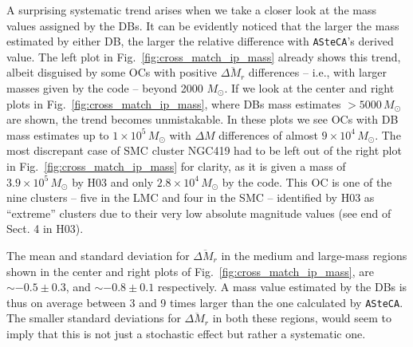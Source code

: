 \documentclass{aa}
\begin{document}
A surprising systematic trend arises when we take a closer look at the mass
values assigned by the DBs. It can be evidently noticed that the larger the
mass estimated by either DB, the larger the relative difference with 
\texttt{ASteCA}'s derived value. The left plot in
Fig.~\ref{fig:cross_match_ip_mass} already shows this trend, albeit disguised by
some OCs with positive $\overline{\Delta M_r}$ differences --
i.e., with larger masses given by the code -- beyond 2000 $M_{\odot}$.
%
If we look at the center and right plots in Fig.~\ref{fig:cross_match_ip_mass},
where DBs mass estimates ${>}5000\,M_{\odot}$ are shown, the trend becomes
unmistakable.
In these plots we see OCs with DB mass estimates up to $1{\times}10^5\,M_{\odot}$
with $\Delta M$ differences of almost $9{\times}10^4\,M_{\odot}$.
The most discrepant case of SMC cluster NGC419 had to be left out of the right
plot in Fig.~\ref{fig:cross_match_ip_mass} for clarity, as it is given a mass of
$3.9{\times}10^5\,M_{\odot}$ by H03 and only $2.8{\times}10^4\,M_{\odot}$ by the
code. This OC is one of the nine clusters -- five in the LMC and four in the SMC
-- identified by H03 as ``extreme'' clusters due to their very low absolute
magnitude values (see end of Sect. 4 in H03).

The mean and standard deviation for $\overline{\Delta M_r}$ in the medium and
large-mass regions shown in the center and right plots of
Fig.~\ref{fig:cross_match_ip_mass}, are ${\sim-}0.5{\pm}0.3$,
and ${\sim-}0.8{\pm}0.1$ respectively.
A mass value estimated by the DBs is thus on average between 3 and 9 times
larger than the one calculated by \texttt{ASteCA}.
The smaller standard deviations for $\overline{\Delta M_r}$ in both these
regions, would seem to imply that this is not just a stochastic effect but
rather a systematic one.
\end{document}
